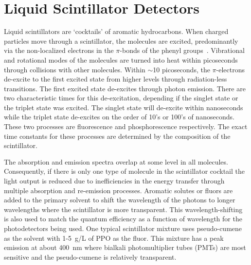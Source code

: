 \documentclass[aps,prc,twocolumn,groupedaddress,showpacs,amsmath,amssymb,floatfix,superscriptaddress]{revtex4}
\begin{document}
\section{Liquid Scintillator Detectors}
Liquid scintillators are `cocktails' of aromatic hydrocarbons. When
charged particles move through a scintillator, the molecules are
excited, predominantly via the non-localized electrons in the
$\pi$-bonds of the phenyl groups~\cite{birks_book}. Vibrational
and rotational modes of the molecules are turned into heat within
picoseconds through collisions with other molecules.  Within $\sim$10
picoseconds, the $\pi$-electrons de-excite to the first excited state
from higher levels through radiation-less transitions. The first
excited state de-excites through photon emission. There are two
characteristic times for this de-excitation, depending if the singlet
state or the triplet state was excited.  The singlet state will
de-excite within nanoseconds while the triplet state de-excites on the
order of 10's or 100's of nanoseconds. These two processes are
fluorescence and phosphorescence respectively. The exact time
constants for these processes are determined by the composition of the
scintillator.

The absorption and emission spectra overlap at some level
in all molecules. Consequently, if there is only one type of molecule in
the scintillator cocktail the light output is reduced due to
inefficiencies in the energy transfer through multiple absorption and
re-emission processes. Aromatic solutes or fluors are added to the
primary solvent to shift the wavelength of the photons to longer
wavelengths where the scintillator is more transparent. This
wavelength-shifting is also used to match the quantum efficiency as a
function of wavelength for the photodetectors being used. One typical
scintillator mixture uses pseudo-cumene as the solvent with 1-5~g/L of
PPO as the fluor. This mixture has a peak emission at about 400~nm
where bialkali photomultiplier tubes (PMTs) are most sensitive and the
pseudo-cumene is relatively transparent.
\end{document}
